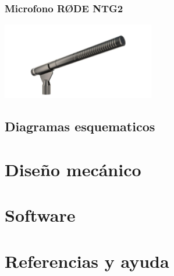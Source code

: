 \documentclass[a4paper]{book}
\begin{document}
\subsection{Microfono RØDE NTG2}

\begin{center}
\includegraphics[width=0.5\textwidth]{Figures/Hardware/Partes/Rode.jpg}
\label{fig:Hardware:Partes:RODE}
\end{center}


\section{Diagramas esquematicos}
\chapter{Diseño mecánico}
\chapter{Software}
\chapter{Referencias y ayuda}
\end{document}
